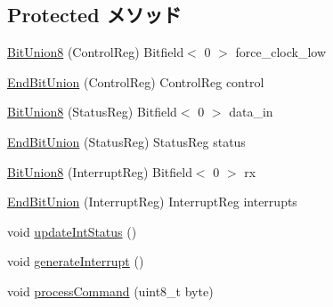 \subsection*{Protected メソッド}
\begin{DoxyCompactItemize}
\item 
\hyperlink{classPl050_a12eff01be6a763bdde7517ade0fb4c3b}{BitUnion8} (ControlReg) Bitfield$<$ 0 $>$ force\_\-clock\_\-low
\item 
\hyperlink{classPl050_ae5769101277017b333eb93fb1bd4241e}{EndBitUnion} (ControlReg) ControlReg control
\item 
\hyperlink{classPl050_a8d38b04829a0d44ca73abac2d923445e}{BitUnion8} (StatusReg) Bitfield$<$ 0 $>$ data\_\-in
\item 
\hyperlink{classPl050_aa9e28741f3f4858715bb5d4147fd5b02}{EndBitUnion} (StatusReg) StatusReg status
\item 
\hyperlink{classPl050_aaad187ce47ad27fa2f7b32559402bc3e}{BitUnion8} (InterruptReg) Bitfield$<$ 0 $>$ rx
\item 
\hyperlink{classPl050_a429076a6961a34396291ae1f31258c78}{EndBitUnion} (InterruptReg) InterruptReg interrupts
\item 
void \hyperlink{classPl050_a3923da0a193dd22650c252c4eae4743d}{updateIntStatus} ()
\item 
void \hyperlink{classPl050_ab251ef5c4d9e1f0239542a9d8aa0dc3e}{generateInterrupt} ()
\item 
void \hyperlink{classPl050_a71bcba1e6fb2b38cac48b70b7a227c05}{processCommand} (uint8\_\-t byte)
\end{DoxyCompactItemize}

